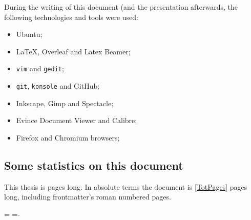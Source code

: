 During the writing of this document (and the presentation afterwards, the following technologies and tools were used:
 \begin{itemize}[noitemsep]
	\item Ubuntu;
	\item \LaTeX, \gls{Overleaf} and Latex \gls{Beamer};
	\item \texttt{\gls{vim}} and \texttt{\gls{gedit}};
	\item \texttt{\gls{git}}, \texttt{\gls{konsole}} and \gls{GitHub};
	\item \gls{Inkscape}, \gls{Gimp} and \gls{Spectacle};
	\item \gls{Evince} Document Viewer and \gls{Calibre};
	\item \gls{Firefox} and \gls{Chromium} browsers;
\end{itemize}

\subsection{Some statistics on this document} \label{subsection:Preface/Aboutthisthesis/Somestatisticsonthisdocument}
This thesis is \pageref*{TotPages} pages long.
In absolute terms the document is \ref*{TotPages} pages long, including frontmatter's roman numbered pages.

\newcount\thetotalbibentriessumpagetotal
\newcount\thetotalbibentriesnononline%
\newcount\thetotalbibentriesonline%
\newcount\bibentriesaveragepagetotal%
\thetotalbibentriessumpagetotal=\numexpr \thetotalbibentriesnononline*\bibentriesaveragepagetotal\relax%
\thetotalbibentriesonline=\numexpr\thetotalbibentries-\thetotalbibentriesnononline\relax


